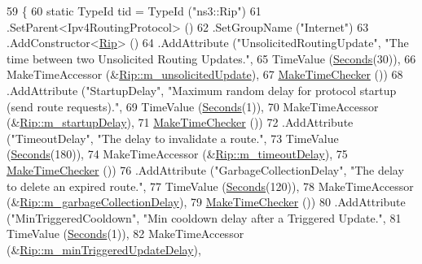 \begin{DoxyCode}
59 \{
60   \textcolor{keyword}{static} TypeId tid = TypeId (\textcolor{stringliteral}{"ns3::Rip"})
61     .SetParent<Ipv4RoutingProtocol> ()
62     .SetGroupName (\textcolor{stringliteral}{"Internet"})
63     .AddConstructor<\hyperlink{classns3_1_1Rip_a2593bb8e6e858298059ac53ee265fe21}{Rip}> ()
64     .AddAttribute (\textcolor{stringliteral}{"UnsolicitedRoutingUpdate"}, \textcolor{stringliteral}{"The time between two Unsolicited Routing Updates."},
65                    TimeValue (\hyperlink{group__timecivil_ga33c34b816f8ff6628e33d5c8e9713b9e}{Seconds}(30)),
66                    MakeTimeAccessor (&\hyperlink{classns3_1_1Rip_aabc5098465aa38f416c5daa7561d3ea0}{Rip::m\_unsolicitedUpdate}),
67                    \hyperlink{group__time_ga7032965bd4afa578691d88c09e4481c1}{MakeTimeChecker} ())
68     .AddAttribute (\textcolor{stringliteral}{"StartupDelay"}, \textcolor{stringliteral}{"Maximum random delay for protocol startup (send route requests)."},
69                    TimeValue (\hyperlink{group__timecivil_ga33c34b816f8ff6628e33d5c8e9713b9e}{Seconds}(1)),
70                    MakeTimeAccessor (&\hyperlink{classns3_1_1Rip_a26dfd4f6ce345b6259733027a77fbcc9}{Rip::m\_startupDelay}),
71                    \hyperlink{group__time_ga7032965bd4afa578691d88c09e4481c1}{MakeTimeChecker} ())
72     .AddAttribute (\textcolor{stringliteral}{"TimeoutDelay"}, \textcolor{stringliteral}{"The delay to invalidate a route."},
73                    TimeValue (\hyperlink{group__timecivil_ga33c34b816f8ff6628e33d5c8e9713b9e}{Seconds}(180)),
74                    MakeTimeAccessor (&\hyperlink{classns3_1_1Rip_a8a684a47271e0e382dd5f485a8a5545b}{Rip::m\_timeoutDelay}),
75                    \hyperlink{group__time_ga7032965bd4afa578691d88c09e4481c1}{MakeTimeChecker} ())
76     .AddAttribute (\textcolor{stringliteral}{"GarbageCollectionDelay"}, \textcolor{stringliteral}{"The delay to delete an expired route."},
77                    TimeValue (\hyperlink{group__timecivil_ga33c34b816f8ff6628e33d5c8e9713b9e}{Seconds}(120)),
78                    MakeTimeAccessor (&\hyperlink{classns3_1_1Rip_ad317e92ae9d78b20642be47df4e8d866}{Rip::m\_garbageCollectionDelay}),
79                    \hyperlink{group__time_ga7032965bd4afa578691d88c09e4481c1}{MakeTimeChecker} ())
80     .AddAttribute (\textcolor{stringliteral}{"MinTriggeredCooldown"}, \textcolor{stringliteral}{"Min cooldown delay after a Triggered Update."},
81                    TimeValue (\hyperlink{group__timecivil_ga33c34b816f8ff6628e33d5c8e9713b9e}{Seconds}(1)),
82                    MakeTimeAccessor (&\hyperlink{classns3_1_1Rip_a9345ff42e947fb0edb2382d6c4f50bd0}{Rip::m\_minTriggeredUpdateDelay}),

\end{DoxyCode}
